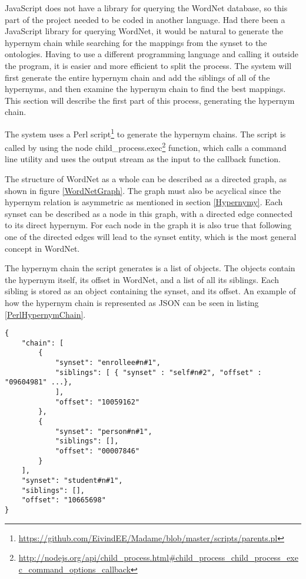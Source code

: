 JavaScript does not have a library for 	querying the WordNet database,
so this part of the project needed to be coded in another language.
Had there been a JavaScript library for querying WordNet,
it would be natural to generate the hypernym chain while searching for the mappings from the synset to the ontologies.
Having to use a different programming language and calling it outside the program,
it is easier and more efficient to split the process.
The system will first generate the entire hypernym chain and add the siblings of all of the hypernyms,
and then examine the hypernym chain to find the best mappings.
This section will describe the first part of this process, generating the hypernym chain.

The system uses a Perl script\footnote{\url{https://github.com/EivindEE/Madame/blob/master/scripts/parents.pl}} to generate the hypernym chains.
The script is called by using the node
child\_process.exec\footnote{\url{http://nodejs.org/api/child\_process.html\#child\_process\_child\_process\_exec\_command\_options\_callback}}
function, which calls a command line utility and uses the output stream as the input to the callback function.

The structure of WordNet as a whole can be described as a directed graph, as shown in figure \ref{WordNetGraph}.
The graph must also be acyclical since the hypernym relation is asymmetric as mentioned in section \ref{Hypernymy}.
Each synset can be described as a node in this graph, with a directed edge connected to its direct hypernym.
For each node in the graph it is also true that following one of the directed edges will lead to the synset {entity},
which is the most general concept in WordNet.

The hypernym chain the script generates is a list of objects.
The objects contain the hypernym itself, its offset in WordNet, and a list of all its siblings.
Each sibling is stored as an object containing the synset, and its offset.
An example of how the hypernym chain is represented as JSON can be seen in listing \ref{PerlHypernymChain}.

\begin{lstlisting}[float=t, label=PerlHypernymChain, caption={Excerpt from the hypernym chain for student\#n\#1}]
{
	"chain": [
		{
			"synset": "enrollee#n#1",
			"siblings": [ { "synset" : "self#n#2", "offset" : "09604981" ...},
			],
			"offset": "10059162"
		},
		{
			"synset": "person#n#1",
			"siblings": [],
			"offset": "00007846"
		}
	],
	"synset": "student#n#1",
	"siblings": [],
	"offset": "10665698"
}
\end{lstlisting}

